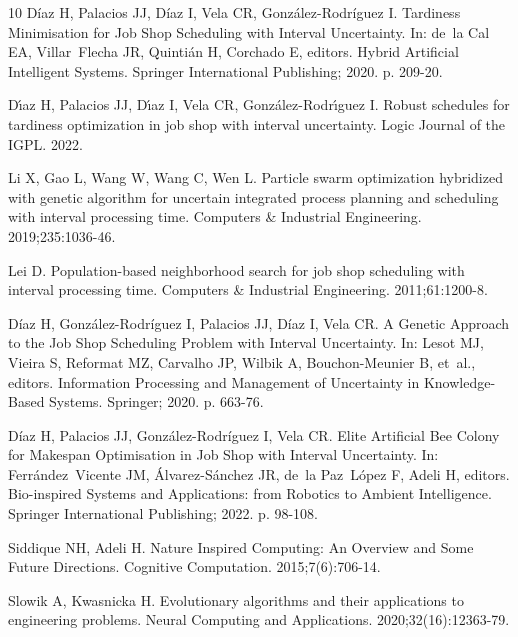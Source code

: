 \documentclass[icae]{iosart2x}
\begin{document}
\begin{thebibliography}{10}
D{\'i}az H, Palacios JJ, D{\'i}az I, Vela CR, Gonz{\'a}lez-Rodr{\'i}guez I.
\newblock Tardiness Minimisation for Job Shop Scheduling with Interval
  Uncertainty.
\newblock In: de~la Cal EA, Villar~Flecha JR, Quinti{\'a}n H, Corchado E,
  editors. Hybrid Artificial Intelligent Systems. Springer International
  Publishing; 2020. p. 209-20.

D\'{\i}az H, Palacios JJ, D\'{\i}az I, Vela CR, Gonz\'alez-Rodr\'{\i}guez I.
\newblock Robust schedules for tardiness optimization in job shop with interval
  uncertainty.
\newblock Logic Journal of the IGPL. 2022.

Li X, Gao L, Wang W, Wang C, Wen L.
\newblock Particle swarm optimization hybridized with genetic algorithm for
  uncertain integrated process planning and scheduling with interval processing
  time.
\newblock Computers \& Industrial Engineering. 2019;235:1036-46.

Lei D.
\newblock Population-based neighborhood search for job shop scheduling with
  interval processing time.
\newblock Computers \& Industrial Engineering. 2011;61:1200-8.

D{\'i}az H, Gonz{\'a}lez-Rodr{\'i}guez I, Palacios JJ, D{\'i}az I, Vela CR.
\newblock A Genetic Approach to the Job Shop Scheduling Problem with Interval
  Uncertainty.
\newblock In: Lesot MJ, Vieira S, Reformat MZ, Carvalho JP, Wilbik A,
  Bouchon-Meunier B, et~al., editors. Information Processing and Management of
  Uncertainty in Knowledge-Based Systems. Springer; 2020. p. 663-76.

D{\'i}az H, Palacios JJ, Gonz{\'a}lez-Rodr{\'i}guez I, Vela CR.
\newblock Elite Artificial Bee Colony for Makespan Optimisation in Job Shop
  with Interval Uncertainty.
\newblock In: Ferr{\'a}ndez~Vicente JM, {\'A}lvarez-S{\'a}nchez JR, de~la
  Paz~L{\'o}pez F, Adeli H, editors. Bio-inspired Systems and Applications:
  from Robotics to Ambient Intelligence. Springer International Publishing;
  2022. p. 98-108.

Siddique NH, Adeli H.
\newblock Nature Inspired Computing: An Overview and Some Future Directions.
\newblock Cognitive Computation. 2015;7(6):706-14.

Slowik A, Kwasnicka H.
\newblock Evolutionary algorithms and their applications to engineering
  problems.
\newblock Neural Computing and Applications. 2020;32(16):12363-79.


\end{thebibliography}
\end{document}
